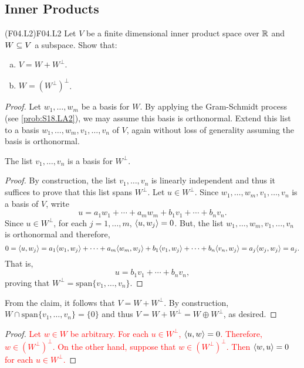 \documentclass[../../AlgebraQualSolutions.tex]{subfiles}
\begin{document}
\subsection{Inner Products}

\begin{prob}{(F04.L2)}{F04.L2}
    Let $V$ be a finite dimensional inner product space over $\mathbb{R}$ and $W \subseteq V$ a subspace. Show that:

    \begin{enumerate}[(a)]
        \item $V = W + W^\perp$.
        \item $W = (W^\perp)^\perp$.
    \end{enumerate}
\end{prob}

\begin{proof}
    Let $w_1,\ldots, w_m$ be a basis for $W$. By applying the Gram-Schmidt process (see \ref{prob:S18.LA2}), we may assume this basis is orthonormal. Extend this list to a basis $w_1,\ldots, w_m, v_1, \ldots, v_n$ of $V$, again without loss of generality assuming the basis is orthonormal.

    \begin{claim}
        The list $v_1, \ldots, v_n$ is a basis for $W^\perp$. 

        \begin{proof}
            By construction, the list $v_1, \ldots, v_n$ is linearly independent and thus it suffices to prove that this list spans $W^\perp$. Let $u \in W^\perp$. Since $w_1,\ldots, w_m, v_1, \ldots, v_n$ is a basis of $V$, write
                \[u = a_1w_1 + \cdots + a_m w_m  + b_1v_1 + \cdots + b_n v_n.\]
            Since $u \in W^\perp$, for each $j = 1,\ldots, m$, $\langle u, w_j\rangle = 0$. But, the list $w_1,\ldots, w_m, v_1, \ldots, v_n$ is orthonormal and therefore,
                \[0 = \langle u, w_j\rangle = a_1 \langle w_1, w_j\rangle + \cdots + a_m \langle w_m, w_j\rangle + b_1 \langle v_1, w_j\rangle + \cdots + b_n \langle v_n, w_j\rangle = a_j\langle w_j, w_j\rangle = a_j.\]
            That is,
                \[u = b_1v_1 + \cdots + b_n v_n,\]
            proving that $W^\perp = \textrm{span}\{v_1, \ldots, v_n\}$.
        \end{proof}
    \end{claim}
    From the claim, it follows that $V = W + W^\perp$. By construction, $W \cap \textrm{span}\{v_1, \ldots, v_n\} = \{0\}$ and thus $V = W + W^\perp = W \oplus W^\perp$, as desired.
\end{proof}

\begin{proof}
    \textcolor{red}{Let $w \in W$ be arbitrary. For each $u \in W^\perp$, $\langle u, w\rangle = 0$. Therefore, $w \in (W^\perp)^\perp$. On the other hand, suppose that $w \in (W^\perp)^\perp$. Then $\langle w, u\rangle = 0$ for each $u \in W^\perp$.}
\end{proof}
\end{document}
